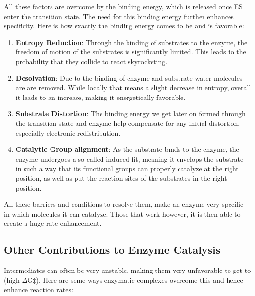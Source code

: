 \documentclass[../main.tex]{subfiles}
\begin{document}
All these factors are overcome by the binding energy, which is released once ES enter the transition state. The need for this binding energy further enhances specificity. Here is how exactly the binding energy comes to be and is favorable:

\begin{enumerate}
	\item \textbf{Entropy Reduction}: Through the binding of substrates to the enzyme, the freedom of motion of the substrates is significantly limited. This leads to the probability that they collide to react skyrocketing.
	\item \textbf{Desolvation}: Due to the binding of enzyme and substrate water molecules are are removed. While locally that means a slight decrease in entropy, overall it leads to an increase, making it energetically favorable.
	\item \textbf{Substrate Distortion}: The binding energy we get later on formed through the transition state and enzyme help compensate for any initial distortion, especially electronic redistribution.
	\item \textbf{Catalytic Group alignment}: As the substrate binds to the enzyme, the enzyme undergoes a so called induced fit, meaning it envelops the substrate in such a way that its functional groups can properly catalyze at the right position, as well as put the reaction sites of the substrates in the right position.
\end{enumerate}

All these barriers and conditions to resolve them, make an enzyme very specific in which molecules it can catalyze. Those that work however, it is then able to create a huge rate enhancement.


\subsection{Other Contributions to Enzyme Catalysis}

Intermediates can often be very unstable, making them very unfavorable to get to (high $\Delta$G$\ddagger$). Here are some ways enzymatic complexes overcome this and hence enhance reaction rates:
\end{document}
